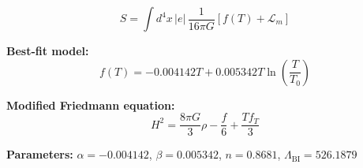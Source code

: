 
\begin{equation}
  S = \int d^4x \, |e| \, \frac{1}{16\pi G} \left[ f(T) + \mathcal{L}_m \right]
\end{equation}

\textbf{Best-fit model:}
\begin{equation}
  f(T) = -0.004142 T + 0.005342 T \ln\!\left(\frac{T}{T_0}\right)
\end{equation}

\textbf{Modified Friedmann equation:}
\begin{equation}
  H^2 = \frac{8\pi G}{3} \rho - \frac{f}{6} + \frac{T f_T}{3}
\end{equation}

\textbf{Parameters:}
$\alpha = -0.004142$, \quad
$\beta = 0.005342$, \quad
$n = 0.8681$, \quad
$\Lambda_{\text{BI}} = 526.1879$